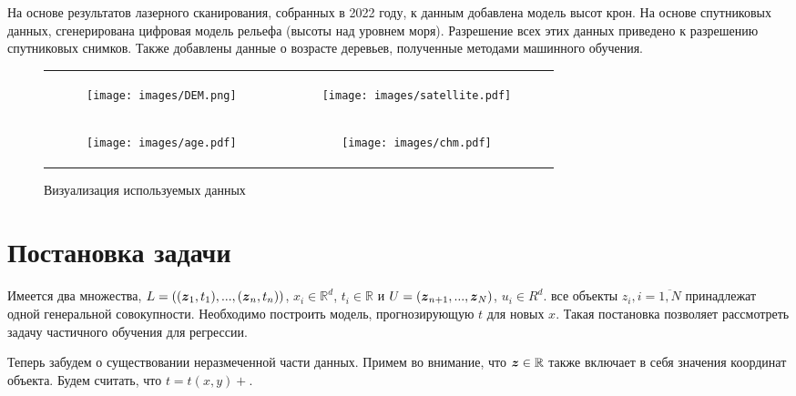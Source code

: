 \documentclass{article}
\def\vec#1{\mathchoice{\mbox{\boldmath$\displaystyle#1$}}
{\mbox{\boldmath$\textstyle#1$}} {\mbox{\boldmath$\scriptstyle#1$}} {\mbox{\boldmath$\scriptscriptstyle#1$}}}
\begin{document}
На основе результатов лазерного сканирования, собранных в 2022 году, к данным добавлена модель высот крон. На основе спутниковых данных, сгенерирована цифровая модель рельефа (высоты над уровнем моря). Разрешение всех этих данных приведено к разрешению спутниковых снимков. Также добавлены данные о возрасте деревьев, полученные методами машинного обучения.

\begin{figure}[h]
    \centering
    \begin{tabular}{cc}
        \begin{subfigure}
            \centering
            \texttt{[image: images/DEM.png]}
            \label{fig:dem}
        \end{subfigure}
        &
        \begin{subfigure}
            \centering
            \texttt{[image: images/satellite.pdf]}
            \label{fig:sentinel}
        \end{subfigure}
        \\[1em]
        \begin{subfigure}
            \centering
            \texttt{[image: images/age.pdf]}
            \label{fig:age}
        \end{subfigure}
        &
        \begin{subfigure}
            \centering
            \texttt{[image: images/chm.pdf]}
            \label{fig:height}
        \end{subfigure}
    \end{tabular}
    \caption{Визуализация используемых данных}
    \label{fig:remote_sensing_data}
\end{figure}

\section{Постановка задачи}
Имеется два множества, $L = ((\vec{z}_1, t_1), ..., (\vec{z}_n, t_n))$, $x_i \in \mathbb{R}^{d}$, $t_i \in \mathbb{R}$ и $U = (\vec{z}_{n+1}, ..., \vec{z}_N)$, $u_i \in R^{d}$. все объекты $z_i, i=\overline{1, N}$ принадлежат одной генеральной совокупности. Необходимо построить модель, прогнозирующую $t$ для новых $x$. Такая постановка позволяет рассмотреть задачу частичного обучения для регрессии.

Теперь забудем о существовании неразмеченной части данных. Примем во внимание, что $\vec{z} \in \mathbb{R}$ также включает в себя значения координат объекта. Будем считать, что $t = t(x, y) + $. 
\end{document}
